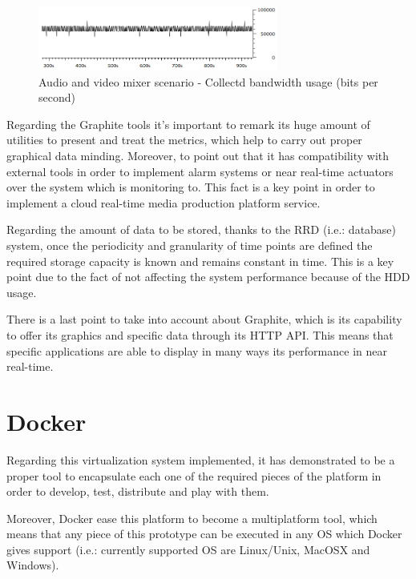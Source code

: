 \begin{figure}[!htb]
\begin{center}
\includegraphics[width=0.70\textwidth]{./images/testAVMix/collectdBWbits.png}
\caption{Audio and video mixer scenario - Collectd bandwidth usage (bits per second)}
\label{F:avmscbu}
\end{center}
\end{figure}

Regarding the Graphite tools it's important to remark its huge amount of utilities to present and treat the metrics, which help to carry out proper graphical data minding. Moreover, to point out that it has compatibility with external tools in order to implement alarm systems or near real-time actuators over the system which is monitoring to. This fact is a key point in order to implement a cloud real-time media production platform service. 

Regarding the amount of data to be stored, thanks to the RRD (i.e.: database) system, once the periodicity and granularity of time points are defined the required storage capacity is known and remains constant in time. This is a key point due to the fact of not affecting the system performance because of the HDD usage.

There is a last point to take into account about Graphite, which is its capability to offer its graphics and specific data through its HTTP API. This means that specific applications are able to display in many ways its performance in near real-time.

\section{Docker}

Regarding this virtualization system implemented, it has demonstrated to be a proper tool to encapsulate each one of the required pieces of the platform in order to develop, test, distribute and play with them.

Moreover, Docker ease this platform to become a multiplatform tool, which means that any piece of this prototype can be executed in any OS which Docker gives support (i.e.: currently supported OS are Linux/Unix, MacOSX and Windows).


